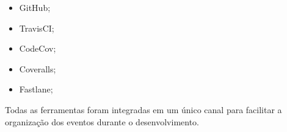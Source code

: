 \begin{itemize}
    \item GitHub;
    \item TravisCI;
    \item CodeCov;
    \item Coveralls;
    \item Fastlane;
\end{itemize}

Todas as ferramentas foram integradas em um único canal para facilitar a organização dos eventos durante o desenvolvimento.
